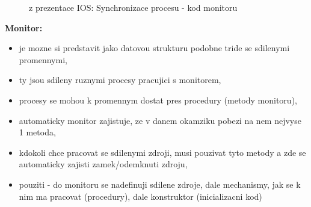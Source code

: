 \documentclass[a4paper, 11pt]{article}
\begin{document}
\begin{figure} [h]
    \centering
    \caption{z prezentace IOS: Synchronizace procesu - kod monitoru}
\end{figure}

\textbf{Monitor:}
\begin{itemize}
    \item je mozne si predstavit jako datovou strukturu podobne tride se sdilenymi promennymi,
    \item ty jsou sdileny ruznymi procesy pracujici s monitorem,
    \item procesy se mohou k promennym dostat pres procedury (metody monitoru),
    \item automaticky monitor zajistuje, ze v danem okamziku pobezi na nem nejvyse 1 metoda,
    \item kdokoli chce pracovat se sdilenymi zdroji, musi pouzivat tyto metody a zde se automaticky zajisti zamek/odemknuti zdroju,
    \item pouziti - do monitoru se nadefinuji sdilene zdroje, dale mechanismy, jak se k nim ma pracovat (procedury), dale konstruktor (inicializacni kod) \\
\end{itemize}

\newpage
\end{document}
